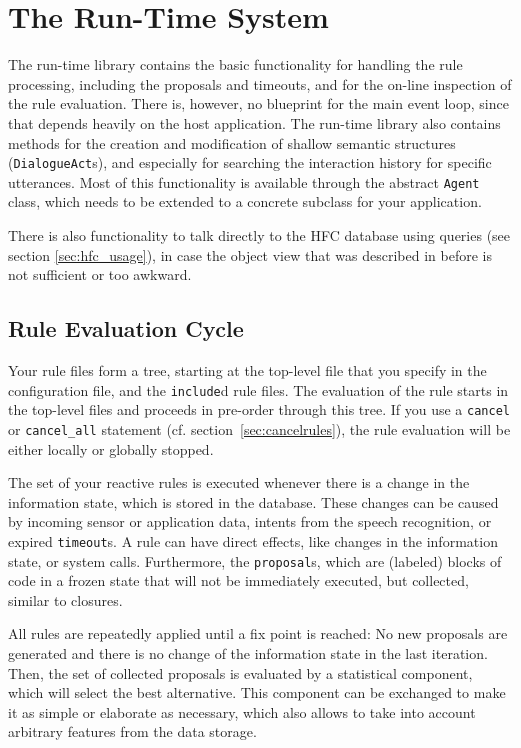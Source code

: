 \section{The Run-Time System}

The run-time library contains the basic functionality for handling the rule
processing, including the proposals and timeouts, and for the on-line
inspection of the rule evaluation. There is, however, no blueprint for the main
event loop, since that depends heavily on the host application. The run-time
library also contains methods for the creation and modification of shallow
semantic structures (\texttt{DialogueAct}s), and especially for searching the
interaction history for specific utterances. Most of this functionality is
available through the abstract \texttt{Agent} class, which needs to be extended
to a concrete subclass for your application.

There is also functionality to talk directly to the HFC database using queries
(see section \ref{sec:hfc_usage}), in case the object view that was
described in before is not sufficient or too awkward.

\subsection{Rule Evaluation Cycle}
\label{sec:ruleevaluation}

Your \vonda rule files form a tree, starting at the top-level file that you
specify in the configuration file, and the \texttt{include}d rule files. The
evaluation of the rule starts in the top-level files and proceeds in pre-order
through this tree. If you use a \texttt{cancel} or \texttt{cancel\_all}
statement (cf. section~\ref{sec:cancelrules}), the rule evaluation will be
either locally or globally stopped.

The set of your reactive \vonda rules is executed whenever there is a change in
the information state, which is stored in the database. These changes can be
caused by incoming sensor or application data, intents from the speech
recognition, or expired \texttt{timeout}s.  A rule can have direct effects,
like changes in the information state, or system calls. Furthermore, the
\texttt{proposal}s, which are (labeled) blocks of code in a frozen state that
will not be immediately executed, but collected, similar to closures.

All rules are repeatedly applied until a fix point is reached: No new proposals
are generated and there is no change of the information state in the last
iteration. Then, the set of collected proposals is evaluated by a statistical
component, which will select the best alternative. This component can be
exchanged to make it as simple or elaborate as necessary, which also allows to
take into account arbitrary features from the data storage.

